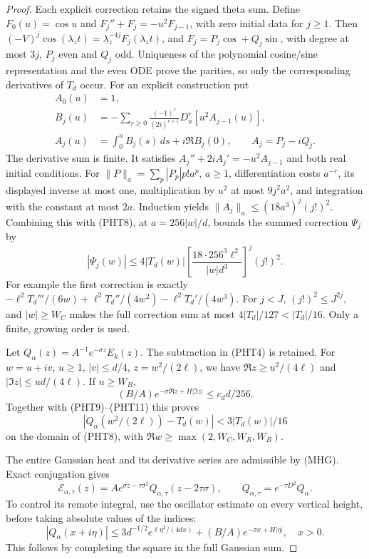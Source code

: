 \documentclass[11pt]{article}
\theoremstyle{remark}\newtheorem{remark}[theorem]{Remark}
\begin{document}
\begin{proof}
Each explicit correction retains the signed theta sum.
Define $F_0(u)=\cos u$ and
$F_j''+F_j=-u^2F_{j-1}$, with zero initial data for $j\ge1$.
Then $(-V)^j\cos(\lambda_z t)=\lambda_z^{-4j}F_j(\lambda_z t)$,
and $F_j=P_j\cos+Q_j\sin$, with degree at most $3j$,
$P_j$ even and $Q_j$ odd.
Uniqueness of the polynomial cosine/sine representation and the even
ODE prove the parities, so only the corresponding derivatives
of $T_d$ occur. For an explicit construction put
\[
 \begin{split}
 A_0(u)&=1,\\
 B_j(u)&=-\sum_{r\ge0}\frac{(-1)^r}{(2i)^{r+1}}
                         D_u^r[u^2A_{j-1}(u)],\\
 A_j(u)&=\int_0^uB_j(s)\,ds+i\Re B_j(0),
                 \qquad A_j=P_j-iQ_j .
 \end{split}                                                   \tag{PHT10}
\]
The derivative sum is finite. It satisfies
$A_j''+2iA_j'=-u^2A_{j-1}$ and both real initial conditions.
For $\|P\|_a=\sum_p|P_p|p!a^p$, $a\ge1$, differentiation
costs $a^{-r}$, its displayed inverse at most one, multiplication
by $u^2$ at most $9j^2a^2$, and integration with the constant
at most $2a$. Induction yields
$\|A_j\|_a\le(18a^3)^j(j!)^2$.
Combining this with (PHT8), at $a=256|w|/d$, bounds the
summed correction $\Psi_j$ by
\[
 |\Psi_j(w)|\le4|T_d(w)|
       \left[\frac{18\cdot256^3\ell^2}{|w|d^3}\right]^j(j!)^2.
                                                               \tag{PHT11}
\]
For example the first correction is exactly
$-\ell^2T_d'''/(6w)+\ell^2T_d''/(4w^2)-\ell^2T_d'/(4w^3)$.
For $j<J$, $(j!)^2\le J^{2j}$, and $|w|\ge W_C$
makes the full correction sum at most $4|T_d|/127<|T_d|/16$.
Only a finite, growing order is used.

Let $Q_\alpha(z)=A^{-1}e^{-\sigma z}E_k(z)$.
The subtraction in (PHT4) is retained.
For $w=u+iv$, $u\ge1$, $|v|\le d/4$, $z=w^2/(2\ell)$,
we have $\Re z\ge u^2/(4\ell)$ and $|\Im z|\le ud/(4\ell)$.
If $u\ge W_B$,
\[
             (B/A)e^{-\sigma\Re z+H|\Im z|}\le c_dd/256.
\]
Together with (PHT9)--(PHT11) this proves
\[
 |Q_\alpha(w^2/(2\ell))-T_d(w)|<3|T_d(w)|/16             \tag{PHT12}
\]
on the domain of (PHT8), with $\Re w\ge\max(2,W_C,W_R,W_B)$.

The entire Gaussian heat and its derivative series are admissible
by (MHG). Exact conjugation gives
\[
 \mathcal E_{\alpha,\tau}(z)
 =Ae^{\sigma z-\tau\sigma^2}
                   Q_{\alpha,\tau}(z-2\tau\sigma),
        \qquad Q_{\alpha,\tau}=e^{-\tau D^2}Q_\alpha.     \tag{PHT13}
\]
To control its remote integral, use the oscillator estimate on every
vertical height, before taking absolute values of the indices:
\[
 |Q_\alpha(x+i\eta)|\le3d^{-1/2}e^{\ell\eta^2/(4dx)}
                   +(B/A)e^{-\sigma x+H|\eta|},\quad x>0. \tag{PHT14}
\]
This follows by completing the square in the full Gaussian sum.


\end{proof}
\end{document}
